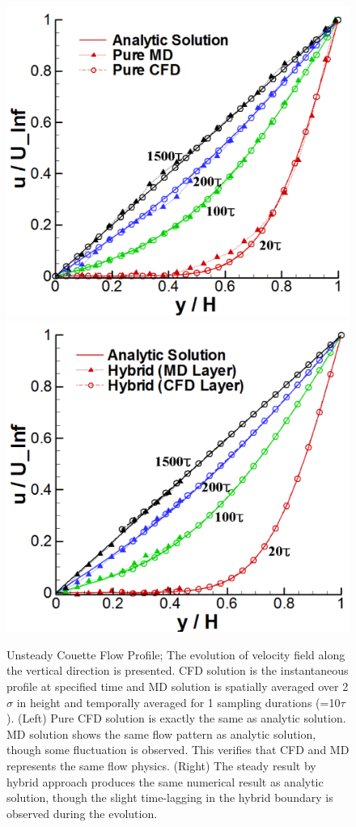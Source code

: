 \documentclass[preprint,12pt]{elsarticle}
\begin{document}
\begin{figure}
\centering
\includegraphics[width=0.6\linewidth]{Flat_Plate_Sol1.pdf}
\hskip 1cm
\includegraphics[width=0.6\linewidth]{Flat_Plate_Sol2.pdf}
\vskip-0.2cm
\caption{\small Unsteady Couette Flow Profile; The evolution of velocity field along the vertical direction is presented. CFD solution is the instantaneous profile at specified time and MD solution is spatially averaged over 2 $\sigma$ in height and temporally averaged for 1 sampling durations (=10$\tau$). (Left) Pure CFD solution is exactly the same as analytic solution. MD solution shows the same flow pattern as analytic solution, though some fluctuation is observed. This verifies that CFD and MD represents the same flow physics. (Right) The steady result by hybrid approach produces the same numerical result as analytic solution, though the slight time-lagging in the hybrid boundary is observed during the evolution.}
\label{Flat_Plate_Sol}
\end{figure}


\end{document}
